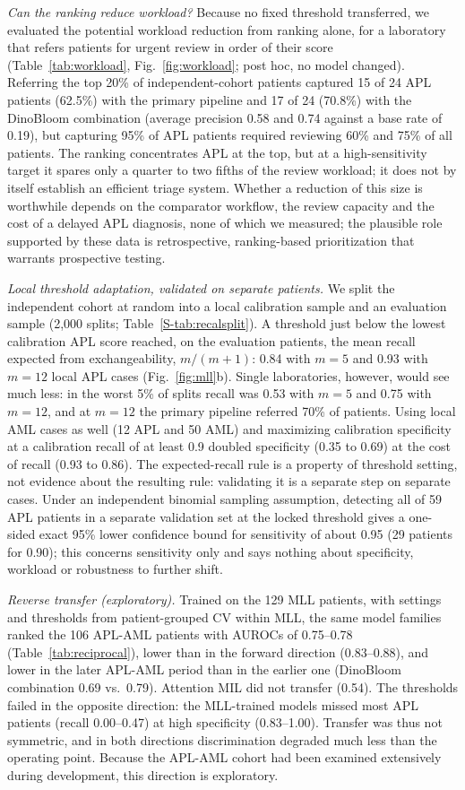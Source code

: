 \documentclass[journal]{IEEEtran}
\begin{document}
\emph{Can the ranking reduce workload?} Because no fixed threshold transferred, we evaluated the potential workload reduction from ranking alone, for a laboratory that refers patients for urgent review in order of their score (Table~\ref{tab:workload}, Fig.~\ref{fig:workload}; post hoc, no model changed). Referring the top 20\% of independent-cohort patients captured 15 of 24 APL patients (62.5\%) with the primary pipeline and 17 of 24 (70.8\%) with the DinoBloom combination (average precision 0.58 and 0.74 against a base rate of 0.19), but capturing 95\% of APL patients required reviewing 60\% and 75\% of all patients. The ranking concentrates APL at the top, but at a high-sensitivity target it spares only a quarter to two fifths of the review workload; it does not by itself establish an efficient triage system. Whether a reduction of this size is worthwhile depends on the comparator workflow, the review capacity and the cost of a delayed APL diagnosis, none of which we measured; the plausible role supported by these data is retrospective, ranking-based prioritization that warrants prospective testing.

\emph{Local threshold adaptation, validated on separate patients.} We split the independent cohort at random into a local calibration sample and an evaluation sample (2,000 splits; Table~\ref{S-tab:recalsplit}). A threshold just below the lowest calibration APL score reached, on the evaluation patients, the mean recall expected from exchangeability, $m/(m+1)$: 0.84 with $m=5$ and 0.93 with $m=12$ local APL cases (Fig.~\ref{fig:mll}b). Single laboratories, however, would see much less: in the worst 5\% of splits recall was 0.53 with $m=5$ and 0.75 with $m=12$, and at $m=12$ the primary pipeline referred 70\% of patients. Using local AML cases as well (12 APL and 50 AML) and maximizing calibration specificity at a calibration recall of at least 0.9 doubled specificity (0.35 to 0.69) at the cost of recall (0.93 to 0.86). The expected-recall rule is a property of threshold setting, not evidence about the resulting rule: validating it is a separate step on separate cases. Under an independent binomial sampling assumption, detecting all of 59 APL patients in a separate validation set at the locked threshold gives a one-sided exact 95\% lower confidence bound for sensitivity of about 0.95 (29 patients for 0.90); this concerns sensitivity only and says nothing about specificity, workload or robustness to further shift.

\emph{Reverse transfer (exploratory).} Trained on the 129 MLL patients, with settings and thresholds from patient-grouped CV within MLL, the same model families ranked the 106 APL-AML patients with AUROCs of 0.75--0.78 (Table~\ref{tab:reciprocal}), lower than in the forward direction (0.83--0.88), and lower in the later APL-AML period than in the earlier one (DinoBloom combination 0.69 vs.\ 0.79). Attention MIL did not transfer (0.54). The thresholds failed in the opposite direction: the MLL-trained models missed most APL patients (recall 0.00--0.47) at high specificity (0.83--1.00). Transfer was thus not symmetric, and in both directions discrimination degraded much less than the operating point. Because the APL-AML cohort had been examined extensively during development, this direction is exploratory.
\end{document}
